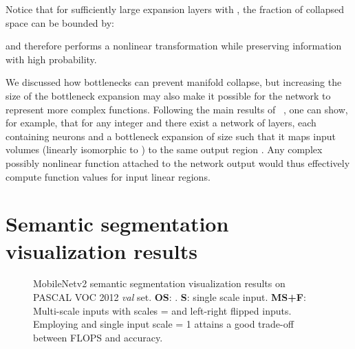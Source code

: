 \documentclass[10pt,twocolumn,letterpaper]{article}
\begin{document}
Notice that for sufficiently large expansion layers with , the fraction of collapsed space  can be bounded by:

and therefore  performs a nonlinear transformation while preserving information with high probability.  

We discussed how bottlenecks can prevent manifold collapse, but increasing the size of the bottleneck expansion may also make it possible for the network to represent more complex functions. Following the main results of ~\cite{Montufar2014}, one can show, for example, that for any integer  and  there exist a network of   layers, each containing  neurons and a bottleneck expansion of size  such that it maps  input volumes (linearly isomorphic to ) to the same output region .
Any complex possibly nonlinear function attached to the network output would thus effectively compute function values for  input linear regions.


\section{Semantic segmentation visualization results}
\label{sec:appendix_segmentation}
\begin{figure*}[!t]
  \centering
  \caption{\mbox{MobileNetv2} semantic segmentation visualization results on \mbox{PASCAL} VOC 2012 {\it val} set. \textbf{OS}: . \textbf{S}: single scale input. \textbf{MS+F}: Multi-scale inputs with scales =  and left-right flipped inputs. Employing  and single input scale = 1 attains a good trade-off between FLOPS and accuracy.}
  \label{fig:vis_mobilenetv2}
\end{figure*}
 
\end{document}
